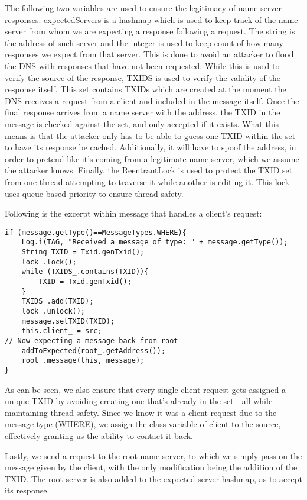\documentclass[a4paper, 12pt]{article} %
\begin{document}
The following two variables are used to ensure the legitimacy of name server responses. expectedServers is a hashmap which is used to keep track of the name server from whom we are expecting a response following a request. The string is the address of such server and the integer is used to keep count of how many responses we expect from that server. This is done to avoid an attacker to flood the DNS with responses that have not been requested. While this is used to verify the source of the response, TXIDS is used to verify the validity of the response itself. This set contains TXIDs which are created at the moment the DNS receives a request from a client and included in the message itself. Once the final response arrives from a name server with the address, the TXID in the message is checked against the set, and only accepted if it exists. What this means is that the attacker only has to be able to guess one TXID within the set to have its response be cached. Additionally, it will have to spoof the address, in order to pretend like it's coming from a legitimate name server, which we assume the attacker knows. Finally, the ReentrantLock is used to protect the TXID set from one thread attempting to traverse it while another is editing it. This lock uses queue based priority to ensure thread safety. 

Following is the excerpt within message that handles a client's request: 

\begin{lstlisting}
if (message.getType()==MessageTypes.WHERE){
    Log.i(TAG, "Received a message of type: " + message.getType());
    String TXID = Txid.genTxid();
    lock_.lock();
    while (TXIDS_.contains(TXID)){
    	TXID = Txid.genTxid();
    }
    TXIDS_.add(TXID);
    lock_.unlock();
    message.setTXID(TXID);
    this.client_ = src;            
// Now expecting a message back from root
    addToExpected(root_.getAddress());
    root_.message(this, message);           
}	
\end{lstlisting}

As can be seen, we also ensure that every single client request gets assigned a unique TXID by avoiding creating one that’s already in the set - all while maintaining thread safety. Since we know it was a client request due to the message type (WHERE), we assign the class variable of client to the source, effectively granting us the ability to contact it back. 

Lastly, we send a request to the root name server, to which we simply pass on the message given by the client, with the only modification being the addition of the TXID. The root server is also added to the expected server hashmap, as to accept its response. 
\end{document}
